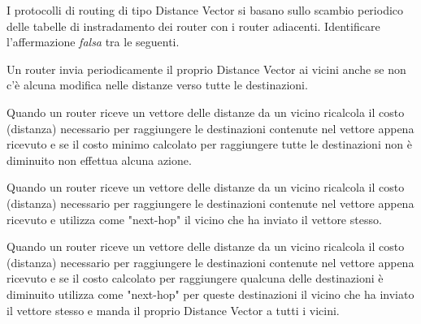 \question[1]
I protocolli di routing di tipo Distance Vector si basano sullo scambio periodico delle tabelle di instradamento dei router con i router adiacenti. Identificare l'affermazione \emph{falsa} tra le seguenti.

\begin{checkboxes}
	\choice Un router invia periodicamente il proprio Distance Vector ai vicini anche se non c'è alcuna modifica nelle distanze verso tutte le destinazioni.

	\choice Quando un router riceve un vettore delle distanze da un vicino ricalcola il costo (distanza) necessario per raggiungere le destinazioni contenute nel vettore appena ricevuto e se il costo minimo calcolato per raggiungere tutte le destinazioni non è diminuito non effettua alcuna azione.

	\CorrectChoice Quando un router riceve un vettore delle distanze da un vicino ricalcola il costo (distanza) necessario per raggiungere le destinazioni contenute nel vettore appena ricevuto e utilizza come "next-hop" il vicino che ha inviato il vettore stesso.

	\choice Quando un router riceve un vettore delle distanze da un vicino ricalcola il costo (distanza) necessario per raggiungere le destinazioni contenute nel vettore appena ricevuto e se il costo calcolato per raggiungere qualcuna delle destinazioni è diminuito utilizza come "next-hop" per queste destinazioni il vicino che ha inviato il vettore stesso e manda il proprio Distance Vector a tutti i vicini.
\end{checkboxes}
